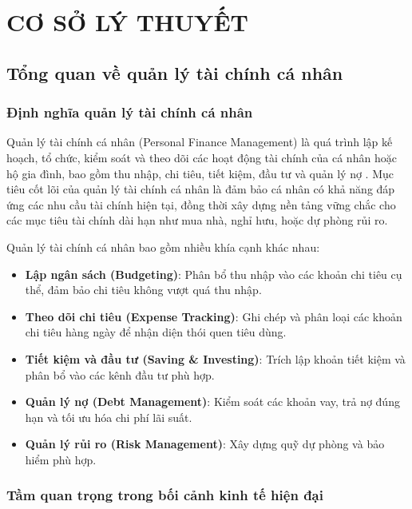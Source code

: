 \chapter{CƠ SỞ LÝ THUYẾT}
\label{ch:theory}

\section{Tổng quan về quản lý tài chính cá nhân}
\label{sec:overview_personal_finance}

\subsection{Định nghĩa quản lý tài chính cá nhân}
\label{subsec:personal_finance_definition}

Quản lý tài chính cá nhân (Personal Finance Management) là quá trình lập kế hoạch, tổ chức, kiểm soát và theo dõi các hoạt động tài chính của cá nhân hoặc hộ gia đình, bao gồm thu nhập, chi tiêu, tiết kiệm, đầu tư và quản lý nợ \cite{ref1}. Mục tiêu cốt lõi của quản lý tài chính cá nhân là đảm bảo cá nhân có khả năng đáp ứng các nhu cầu tài chính hiện tại, đồng thời xây dựng nền tảng vững chắc cho các mục tiêu tài chính dài hạn như mua nhà, nghỉ hưu, hoặc dự phòng rủi ro.

Quản lý tài chính cá nhân bao gồm nhiều khía cạnh khác nhau:

\begin{itemize}
    \item \textbf{Lập ngân sách (Budgeting)}: Phân bổ thu nhập vào các khoản chi tiêu cụ thể, đảm bảo chi tiêu không vượt quá thu nhập.
    \item \textbf{Theo dõi chi tiêu (Expense Tracking)}: Ghi chép và phân loại các khoản chi tiêu hàng ngày để nhận diện thói quen tiêu dùng.
    \item \textbf{Tiết kiệm và đầu tư (Saving \& Investing)}: Trích lập khoản tiết kiệm và phân bổ vào các kênh đầu tư phù hợp.
    \item \textbf{Quản lý nợ (Debt Management)}: Kiểm soát các khoản vay, trả nợ đúng hạn và tối ưu hóa chi phí lãi suất.
    \item \textbf{Quản lý rủi ro (Risk Management)}: Xây dựng quỹ dự phòng và bảo hiểm phù hợp.
\end{itemize}

\subsection{Tầm quan trọng trong bối cảnh kinh tế hiện đại}
\label{subsec:importance_modern_economy}

